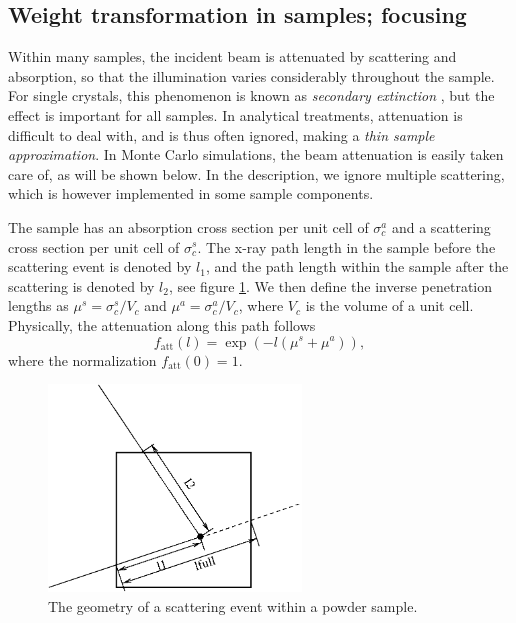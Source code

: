 \subsection{Weight transformation in samples; focusing}

Within many samples,
the incident beam is attenuated by scattering and absorption,
so that the illumination varies considerably throughout the sample.
For single crystals, this phenomenon is known as
{\em secondary extinction} \cite{bacon}, but the effect is
important for all samples.
In analytical treatments, attenuation is difficult to deal with,
and is thus often ignored, making a {\em thin sample approximation}.
In Monte Carlo simulations, the beam attenuation
is easily taken care of, as will be shown below.
In the description, we ignore multiple scattering, which is however
 implemented in some sample components.

The sample has an absorption cross section per unit cell of
$\sigma_c^a$ and a scattering cross section per unit cell
of $\sigma_c^s$. The x-ray path length
in the sample before the scattering event is denoted by $l_1$, and
the path length within the sample after the scattering
is denoted by $l_2$, see figure \ref{powderFig}.
We then define the inverse penetration lengths as
$\mu^s = \sigma_c^s / V_c$ and $\mu^a = \sigma_c^a / V_c$, where
$V_c$ is the volume of a unit cell. Physically, the attenuation
along this path follows
\begin{equation}
f_\mathrm{att}(l) = \exp(- l (\mu^s + \mu^a)) ,
\end{equation}
where the normalization $f_\mathrm{att}(0)=1$.

\begin{figure}
  \begin{center}
    \includegraphics[width=0.6\textwidth]{figures/scatter.eps}
  \end{center}
\caption{The geometry of a scattering event within a powder sample.}
\label{powderFig}
\end{figure}

